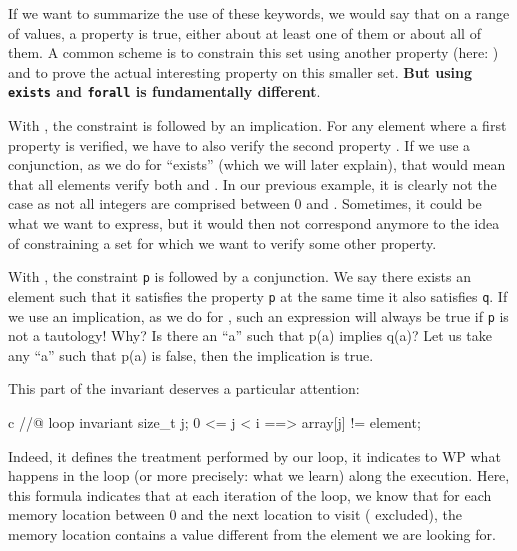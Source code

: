 If we want to summarize the use of these keywords, we would say that on a
range of values, a property is true, either about at least one of them
or about all of them. A common scheme is to constrain this set using
another property (here: ) and to prove the
actual interesting property on this smaller set. \textbf{But using
\texttt{exists} and \texttt{forall} is fundamentally different}.



With ,
the constraint  is followed by an implication.
For any element where a first property  is verified, we have
to also verify the second property . If we use a conjunction,
as we do for ``exists'' (which we will later explain), that would mean that
all elements verify both  and . In our previous
example, it is clearly not the case as not all integers are comprised between
0 and . Sometimes, it could be what we want to express, but
it would then not correspond anymore to the idea of constraining a set for which
we want to verify some other property.



With , the
constraint \texttt{p} is followed by a conjunction. We say there exists
an element such that it satisfies the property \texttt{p} at the same
time it also satisfies \texttt{q}. If we use an implication, as we do
for , such an expression will always be true
if \texttt{p} is not a tautology! Why? Is there an ``a'' such that p(a) implies
q(a)? Let us take any ``a'' such that p(a) is false, then the implication is true.



This part of the invariant deserves a particular attention:



\begin{CodeBlock}{c}
//@ loop invariant \forall size_t j; 0 <= j < i ==> array[j] != element;
\end{CodeBlock}



Indeed, it defines the treatment performed by our loop, it indicates to
WP what happens in the loop (or more precisely: what we learn) along
the execution. Here, this formula indicates that at each iteration of
the loop, we know that for each memory location between 0 and the next
location to visit ( excluded), the memory location contains a
value different from the element we are looking for.

